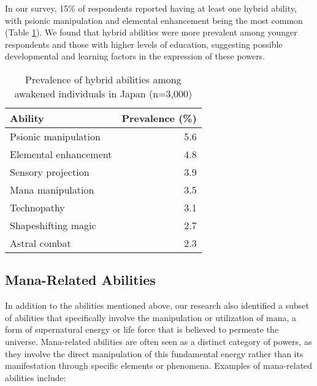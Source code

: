 \documentclass[12pt]{article}
\begin{document}
In our survey, 15\% of respondents reported having at least one hybrid ability, with psionic manipulation and elemental enhancement being the most common (Table \ref{tab:hybridabilities}). We found that hybrid abilities were more prevalent among younger respondents and those with higher levels of education, suggesting possible developmental and learning factors in the expression of these powers.

\begin{table}[h]
\centering
\caption{Prevalence of hybrid abilities among awakened individuals in Japan (n=3,000)}
\label{tab:hybridabilities}
\begin{tabular}{lr}
\toprule
Ability & Prevalence (\%) \\
\midrule
Psionic manipulation & 5.6 \\
Elemental enhancement & 4.8 \\
Sensory projection & 3.9 \\
Mana manipulation & 3.5 \\
Technopathy & 3.1 \\
Shapeshifting magic & 2.7 \\
Astral combat & 2.3 \\
\bottomrule
\end{tabular}
\end{table}

\subsection{Mana-Related Abilities}
In addition to the abilities mentioned above, our research also identified a subset of abilities that specifically involve the manipulation or utilization of mana, a form of supernatural energy or life force that is believed to permeate the universe. Mana-related abilities are often seen as a distinct category of powers, as they involve the direct manipulation of this fundamental energy rather than its manifestation through specific elements or phenomena. Examples of mana-related abilities include:
\end{document}
